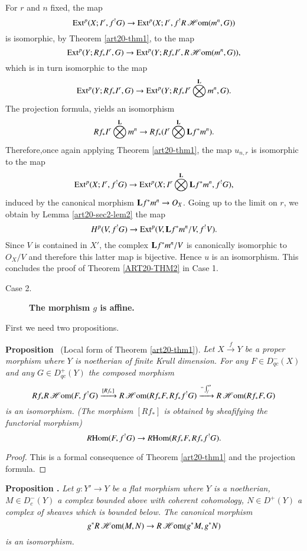 For $r$ and $n$ fixed, the map
$$
\operatorname{\mathrm{Ext}}^{p}(X;I^{r},f^{!}G)\to \operatorname{\mathrm{Ext}}^{p}(X;I^{r},f^{!}R\operatorname{\mathscr{H}\mathrm{om}}(m^{n},G))
$$
is isomorphic, by Theorem \ref{art20-thm1}, to the map 
$$
\operatorname{\mathrm{Ext}}^{p}(Y;Rf_{*}I^{r},G)\to \operatorname{\mathrm{Ext}}^{p}(Y;Rf_{*}I^{r},R\operatorname{\mathscr{H}\mathrm{om}}(m^{n},G)),
$$
which is in turn isomorphic to the map
$$
\operatorname{\mathrm{Ext}}^{p}(Y;Rf_{*}I^{r},G)\to \operatorname{\mathrm{Ext}}^{p}(Y;Rf_{*}I^{r}\bigotimes\limits^{\mathbf{L}}m^{n},G).
$$
The projection formula, yields an isomorphism
$$
Rf_{*}I^{r}\bigotimes\limits^{\mathbf{L}}m^{n}\to Rf_{*}(I^{r}\bigotimes\limits^{\mathbf{L}}\mathbf{L} f^{*}m^{n}).
$$
Therefore,\pageoriginale once again applying Theorem \ref{art20-thm1}, the map $u_{n,r}$ is isomorphic to the map
$$
\operatorname{\mathrm{Ext}}^{p}(X;I^{r},f^{!}G)\to \operatorname{\mathrm{Ext}}^{p}(X;I^{r}\bigotimes\limits^{\mathbf{L}}\mathbf{L} f^{*}m^{n},f^{!}G),
$$
induced by the canonical morphism $\mathbf{L} f^{*}m^{n}\to O_{X}$. Going up to the limit on $r$, we obtain by Lemma \ref{art20-sec2-lem2} the map
$$
H^{p}(V,f^{!}G)\to \operatorname{\mathrm{Ext}}^{p}(V,\mathbf{L} f^{*}m^{n}/V,f^{!}V).
$$
Since $V$ is contained in $X'$, the complex $\mathbf{L} f^{*}m^{n}/V$ is canonically isomorphic to $O_{X}/V$ and therefore this latter map is bijective. Hence $u$ is an isomorphism. This concludes the proof of Theorem \ref{ART20-THM2} in Case 1.
\begin{description}
\item[Case 2.] {\bf The morphism \boldmath$g$ is affine.}
\end{description}

First we need two propositions.

\medskip
\noindent
{\bf Proposition }\label{art20-sec2-prop3}~(Local form of Theorem \ref{art20-thm1}).
{\em Let $X\xrightarrow{f}Y$ be a proper morphism where $Y$ is noetherian of finite Krull dimension. For any $F\in D^{-}_{qc}(X)$ and any $G\in D^{+}_{qc}(Y)$ the composed morphism }
{\fontsize{10pt}{12pt}\selectfont
$$
Rf_{*}R\operatorname{\mathscr{H}\mathrm{om}}(F,f^{!}G)\xrightarrow{[Rf_{*}]}R\operatorname{\mathscr{H}\mathrm{om}} (Rf_{*}F, Rf_{*}f^{!}G)\xrightarrow{``\int_{f}''}R\operatorname{\mathscr{H}\mathrm{om}}(Rf_{*}F,G)
$$}\relax
{\em is an isomorphism. (The morphism $[Rf_{*}]$ is obtained by sheafifying the functorial morphism)}
$$
\operatorname{\textit{R}\mathrm{Hom}} (F,f^{!}G)\to \operatorname{\textit{R}\mathrm{Hom}}(Rf_{*}F,Rf_{*}f^{!}G).
$$

\begin{proof}
This is a formal consequence of Theorem \ref{art20-thm1} and the projection formula.
\end{proof}

\medskip
\noindent
{\bf Proposition .\label{art20-sec2-prop4}}
{\em Let $g:Y'\to Y$ be a flat morphism where $Y$ is a noetherian, $M\in D^{-}_{c}(Y)$ a complex bounded above with coherent cohomology, $N\in D^{+}(Y)$ a complex of sheaves which is bounded below. The canonical morphism}
$$
g^{*}R\operatorname{\mathscr{H}\mathrm{om}}(M,N)\to R\operatorname{\mathscr{H}\mathrm{om}}(g^{*}M,g^{*}N)
$$
{\em is an isomorphism.}
\smallskip

